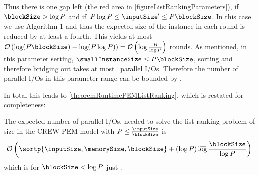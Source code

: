 \documentclass[envcountsame]{llncs}
\newcommand{\lgb}{\mathop{\mathrm{l\hbox to 0pt{\kern .05em $\overline{\vbox to 1.1ex{\hbox to .85em {~}}}$\hss}og}}\nolimits}
\def\bO#1{\printmath{\mathcal{O}\left(#1\right)}}
\begin{document}
Thus there is one gap left (the red area in \autoref{figureListRankingParameters}), if $\blockSize > \log P$ and if~$P \log P \leq \inputSize^\prime \leq P\blockSize$.
In this case we use Algorithm 1 and thus the expected size of the instance in each round is reduced by at least a fourth.
This yields at most~$\bO{\log(P\blockSize) -\log(P\log P)}=\bO{\log\frac{B}{\log P}}$ rounds.
As mentioned, in this parameter setting, $\smallInstanceSize\leq P\blockSize$, sorting and therefore bridging out takes at most~\bO{\log P} parallel I/Os.
Therefore the number of parallel I/Os in this parameter range can be bounded by \bO{(\log\frac{B}{\log P})(\log P)}.

In total this leads to \autoref{theoremRuntimePEMListRanking}, which is restated for completeness:

\begin{theorem}
\label{theoremRuntimePEMListRankingRestated}
The expected number of parallel I/Os, needed to solve the list ranking problem of size  in the CREW PEM model with $P\leq \frac{\inputSize}{\blockSize}$ is 
\begin{eqnarray*}
\mathcal{O}\left(\sortp{\inputSize,\memorySize,\blockSize}+(\log P)\lgb\frac{\blockSize}{\log P}\right) \end{eqnarray*}
which is for $\blockSize < \log P$ just . 
\end{theorem}
\end{document}
